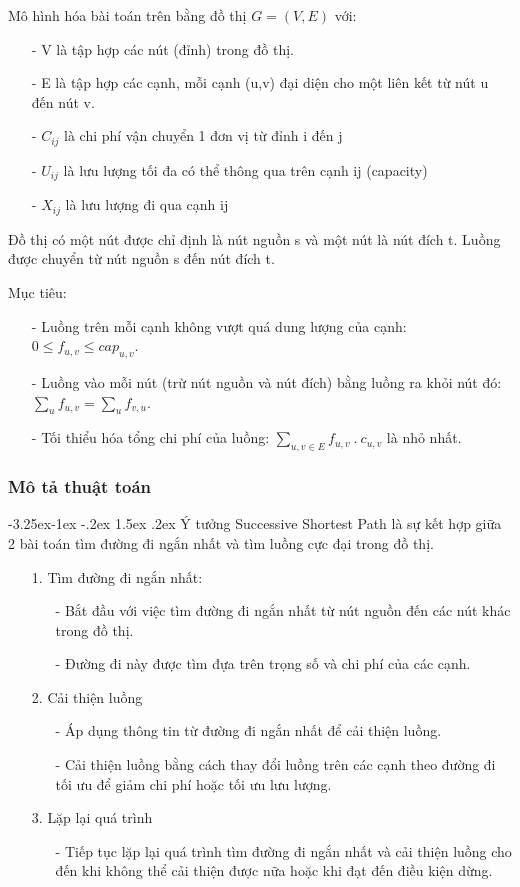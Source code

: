 \documentclass[a4paper]{article}
\makeatletter
\newcounter {subsubsubsection}[subsubsection]
\newcommand\subsubsubsection{\@startsection{subsubsubsection}{4}{\z@}%
                                     {-3.25ex\@plus -1ex \@minus -.2ex}%
                                     {1.5ex \@plus .2ex}%
                                     {\normalfont\normalsize\bfseries}}
\makeatother
\begin{document}
{Mô hình hóa bài toán trên bằng đồ thị $G=(V,E)$ với:}
\begin{enumerate}
    \item[-] {V là tập hợp các nút (đỉnh) trong đồ thị.}
    \item[-] {E là tập hợp các cạnh, mỗi cạnh (u,v) đại diện cho một liên kết từ nút u đến nút v.}
    \item[-] {$C_{ij}$ là chi phí vận chuyển 1 đơn vị từ đỉnh i đến j}
    \item[-] {$U_{ij}$ là lưu lượng tối đa có thể thông qua trên cạnh ij (capacity) }
    \item[-] {$X_{ij}$ là lưu lượng đi qua cạnh ij } 
\end{enumerate}

{Đồ thị có một nút được chỉ định là nút nguồn s và một nút là nút đích t. Luồng được chuyển từ nút nguồn s đến nút đích t.}

{Mục tiêu:}
\begin{enumerate}
    \item[-] {Luồng trên mỗi cạnh không vượt quá dung lượng của cạnh: $0 \leq f_{u,v} \leq cap_{u,v}$.}
    \item[-] {Luồng vào mỗi nút (trừ nút nguồn và nút đích) bằng luồng ra khỏi nút đó: $\sum_{u}f_{u,v}=\sum_{u}f_{v,u}$.}
    \item[-] {Tối thiểu hóa tổng chi phí của luồng: $\sum_{u,v \in E}f_{u,v}~.~c_{u,v}$ là nhỏ nhất.} 
\end{enumerate}
\subsubsection{Mô tả thuật toán}
\subsubsubsection{Ý tưởng}
{Successive Shortest Path là sự kết hợp giữa 2 bài toán tìm đường đi ngắn nhất và tìm luồng cực đại trong đồ thị. }
\begin{enumerate}
    \item[1.] {Tìm đường đi ngắn nhất:}
    \begin{enumerate}
        \item[-] {Bắt đầu với việc tìm đường đi ngắn nhất từ nút nguồn đến các nút khác trong đồ thị. }
        \item[-] {Đường đi này được tìm đựa trên trọng số và chi phí của các cạnh.} 
    \end{enumerate}
    \item[2.] {Cải thiện luồng}
    \begin{enumerate}
        \item[-] {Áp dụng thông tin từ đường đi ngắn nhất để cải thiện luồng.}
        \item[-] {Cải thiện luồng bằng cách thay đổi luồng trên các cạnh theo đường đi tối ưu để giảm chi phí hoặc tối ưu lưu lượng.} 
    \end{enumerate}
    \item[3.] {Lặp lại quá trình}
    \begin{enumerate}
        \item[-] {Tiếp tục lặp lại quá trình tìm đường đi ngắn nhất và cải thiện luồng cho đến khi không thể cải thiện được nữa hoặc khi đạt đến điều kiện dừng.}
    \end{enumerate}
\end{enumerate}
\end{document}
